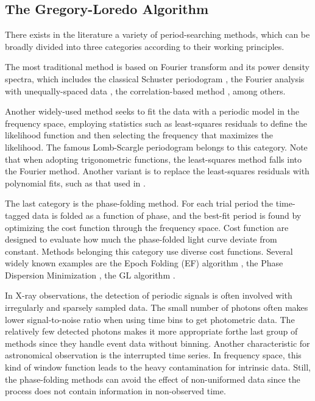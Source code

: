 \documentclass[twoside,twocolumn]{aastex63}
\begin{document}
\subsection{The Gregory-Loredo Algorithm} \label{subsec:GL}
There exists in the literature a variety of period-searching methods, which can be broadly divided into three categories according to their working principles. 

The most traditional method is based on Fourier transform and its power density spectra, which includes the classical Schuster periodogram \citep{1898TeMag...3...13S}, the Fourier analysis with unequally-spaced data \citep{1975Ap&SS..36..137D}, the correlation-based method \citep{1988ApJ...333..646E}, among others.

Another widely-used method seeks to fit the data with a periodic model in the frequency space, employing statistics such as least-squares residuals to define the likelihood function and then selecting the frequency that maximizes the likelihood. The famous Lomb-Scargle periodogram \citep[hereafter LS]{1976Ap&SS..39..447L,1982ApJ...263..835S} belongs to this category. Note that when adopting trigonometric functions, the least-squares method falls into the Fourier method. Another variant is to replace the least-squares residuals with polynomial fits, such as that used in \citet{1996ApJ...460L.107S}.

The last category is the phase-folding method. For each trial period the time-tagged data is folded as a function of phase, and the best-fit period is found by optimizing the cost function through the frequency space. Cost function are designed  to evaluate how much the phase-folded light curve deviate from constant.
Methods belonging this category use diverse cost functions. Several widely known examples are the Epoch Folding (EF) algorithm \citep{1983ApJ...266..160L}, the Phase Dispersion Minimization \citep{1978ApJ...224..953S}, the GL algorithm \citep{1992ApJ...398..146G}.

In X-ray observations, the detection of periodic signals is often involved with irregularly and sparsely sampled data. 
The small number of photons often makes lower signal-to-noise ratio when using time bins to get photometric data.
The relatively few detected photons makes it more appropriate forthe last group of methods since they handle event data without binning. 
Another characteristic for astronomical observation is the interrupted time series. In frequency space, this kind of window function leads to the heavy contamination for intrinsic data. Still, the phase-folding methods can avoid the effect of non-uniformed data since the process does not contain information in non-observed time. 
\end{document}
